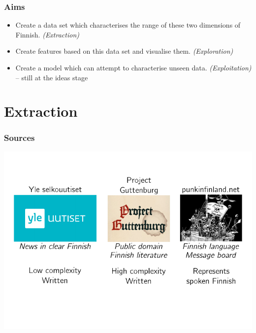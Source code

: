\documentclass{beamer}
\newcommand{\cmark}{\ding{51}}%
\newcommand{\xmark}{\ding{55}}%
\begin{document}
\begin{frame}
\frametitle{Aims}

\begin{itemize}
  \item Create a data set which characterises the range of these two dimensions
        of Finnish. \textit{(Extraction)} \cmark{}\pause{}

  \item Create features based on this data set and visualise them.
        \textit{(Exploration)} \cmark{}\pause{}

  \item Create a model which can attempt to characterise unseen data.
        \textit{(Exploitation)} \xmark{} -- still at the ideas stage
\end{itemize}

\end{frame}

\section{Extraction}

\begin{frame}
\frametitle{Sources}

\includegraphics{sources.pdf}

\end{frame}
\end{document}
